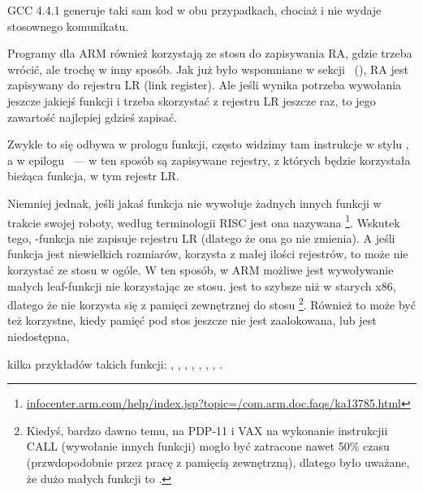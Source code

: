 GCC 4.4.1 generuje taki sam kod w obu przypadkach, chociaż i nie wydaje stosownego komunikatu.


Programy dla ARM również korzystają ze stosu do zapisywania \ac{RA}, gdzie trzeba wrócić, ale trochę w inny sposób.
Jak już było wspomniane w sekcji \q{\HelloWorldSectionName}~(),
\ac{RA} jest zapisywany do rejestru \ac{LR} (\gls{link register}).
Ale jeśli wynika potrzeba wywołania jeszcze jakiejś funkcji i trzeba skorzystać z rejestru \ac{LR} jeszcze
raz, to jego zawartość najlepiej gdzieś zapisać.

Zwykle to się odbywa w prologu funkcji, często widzimy tam instrukcje w stylu , a w epilogu
~--- w ten sposób są zapisywane rejestry, z których będzie korzystała bieżąca funkcja, w tym rejestr \ac{LR}.

Niemniej jednak, jeśli jakaś funkcja nie wywołuje żadnych innych funkcji w trakcie swojej roboty, według terminologii \ac{RISC} jest ona nazywana
\footnote{\href{http://go.yurichev.com/17064}{infocenter.arm.com/help/index.jsp?topic=/com.arm.doc.faqs/ka13785.html}}. 
Wskutek tego, -funkcja nie zapisuje rejestru \ac{LR} (dlatego że ona go nie zmienia).
A jeśli funkcja jest niewielkich rozmiarów, korzysta z małej ilości rejestrów, to może nie korzystać ze stosu w ogóle.
W ten sposób, w ARM możliwe jest wywoływanie małych leaf-funkcji nie korzystając ze stosu.
jest to szybsze niż w starych x86, dlatego że nie korzysta się z pamięci zewnętrznej do stosu
\footnote{Kiedyś, bardzo dawno temu, na PDP-11 i VAX na wykonanie instrukcjii CALL (wywołanie innych funkcji) mogło być zatracone
nawet 50\% czasu (przwdopodobnie przez pracę z pamięcią zewnętrzną),
dlatego było uważane, że dużo małych funkcji to 
.}.
Również to może być też korzystne, kiedy pamięć pod stos jeszcze nie jest zaalokowana, lub jest niedostępna,

kilka przykładów takich funkcji:
, , 
, , ,
, , .


